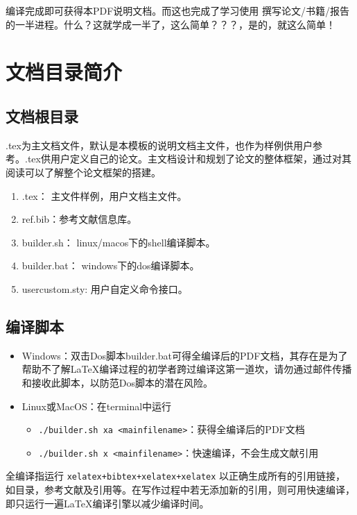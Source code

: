 编译完成即可获得本PDF说明文档。而这也完成了学习使用 \projectname 撰写论文/书籍/报告的一半进程。什么？这就学成一半了，这么简单？？？，是的，就这么简单！

\section{文档目录简介}

\subsection{文档根目录}

\projectname.tex为主文档文件，默认是本模板的说明文档主文件，也作为样例供用户参考。\projectname.tex供用户定义自己的论文。主文档设计和规划了论文的整体框架，通过对其阅读可以了解整个论文框架的搭建。


\begin{enumerate}
    \item \projectname.tex： 主文件样例，用户文档主文件。
    \item ref.bib：参考文献信息库。
    \item builder.sh： linux/macos下的shell编译脚本。
    \item builder.bat： windows下的dos编译脚本。
    \item usercustom.sty: 用户自定义命令接口。
\end{enumerate}

\subsection{编译脚本}

\begin{itemize}
    \item Windows：双击Dos脚本builder.bat可得全编译后的PDF文档，其存在是为了帮助不了解\LaTeX{}编译过程的初学者跨过编译这第一道坎，请勿通过邮件传播和接收此脚本，以防范Dos脚本的潜在风险。
    \item Linux或MacOS：在terminal中运行
        \begin{itemize}
            \item \verb|./builder.sh xa <mainfilename>|：获得全编译后的PDF文档
            \item \verb|./builder.sh x <mainfilename>|：快速编译，不会生成文献引用
        \end{itemize}
\end{itemize}

全编译指运行 \verb|xelatex+bibtex+xelatex+xelatex| 以正确生成所有的引用链接，如目录，参考文献及引用等。在写作过程中若无添加新的引用，则可用快速编译，即只运行一遍\LaTeX{}编译引擎以减少编译时间。

